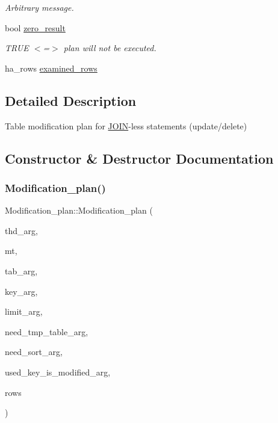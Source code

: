 \begin{DoxyCompactItemize}
\begin{DoxyCompactList}\small\item\em Arbitrary message. \end{DoxyCompactList}\item 
\mbox{\label{classModification__plan_a6615dc7a02532a68b8d816cc1ba52911}} 
bool \mbox{\hyperlink{classModification__plan_a6615dc7a02532a68b8d816cc1ba52911}{zero\+\_\+result}}
\begin{DoxyCompactList}\small\item\em T\+R\+UE $<$=$>$ plan will not be executed. \end{DoxyCompactList}\item 
ha\+\_\+rows \mbox{\hyperlink{classModification__plan_ae7b1b1938ef76f577f52804a6a68509f}{examined\+\_\+rows}}
\end{DoxyCompactItemize}


\subsection{Detailed Description}
Table modification plan for \mbox{\hyperlink{classJOIN}{J\+O\+IN}}-\/less statements (update/delete) 

\subsection{Constructor \& Destructor Documentation}
\mbox{\label{classModification__plan_a0df82723d55b566d68c49b33c0bf26fe}} 
\subsubsection{\texorpdfstring{Modification\+\_\+plan()}{Modification\_plan()}\hspace{0.1cm}{\footnotesize\ttfamily [1/2]}}
{\footnotesize\ttfamily Modification\+\_\+plan\+::\+Modification\+\_\+plan (\begin{DoxyParamCaption}\item[{T\+HD $\ast$}]{thd\+\_\+arg,  }\item[{enum\+\_\+mod\+\_\+type}]{mt,  }\item[{\mbox{\hyperlink{classQEP__TAB}{Q\+E\+P\+\_\+\+T\+AB}} $\ast$}]{tab\+\_\+arg,  }\item[{uint}]{key\+\_\+arg,  }\item[{ha\+\_\+rows}]{limit\+\_\+arg,  }\item[{bool}]{need\+\_\+tmp\+\_\+table\+\_\+arg,  }\item[{bool}]{need\+\_\+sort\+\_\+arg,  }\item[{bool}]{used\+\_\+key\+\_\+is\+\_\+modified\+\_\+arg,  }\item[{ha\+\_\+rows}]{rows }\end{DoxyParamCaption})}

